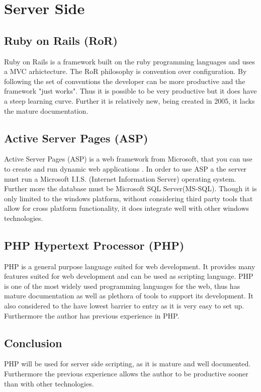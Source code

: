 \documentclass[a4paper,oneside,11pt]{report}
\begin{document}
\section{Server Side} 
\subsection{Ruby on Rails (RoR)}  
Ruby on Rails is a framework built on the ruby programming languages and uses a MVC arhictecture. The RoR philosophy is convention over configuration. By following the set of conventions the developer can be more productive and the framework "just works". Thus it is possible to be very productive but it does have a steep learning curve. Further it is relatively new, being created in 2005, it lacks the mature documentation.

\subsection{Active Server Pages (ASP)} 
 Active Server Pages (ASP) is a web framework from Microsoft, that you can use to create and run dynamic web applications \autocite{microsoftasp}. In order to use ASP a the server must run a Microsoft I.I.S. (Internet Information Server) operating system. Further more the database must be Microsoft SQL Server(MS-SQL). Though it is only limited to the windows platform, without considering third party tools that allow for cross platform functionality, it does integrate well with other windows technologies.
 
\subsection{PHP Hypertext Processor (PHP) } 
PHP is a general purpose language suited for web development. It provides many features suited for web development and can be used as scripting language. PHP is one of the most widely used programming languages for the web, thus has mature documentation as well as plethora of tools to support its development. It also considered to the have lowest barrier to entry as it is very easy to set up. Furthermore the author has previous experience in PHP.

\subsection{Conclusion}
PHP will be used for server side scripting, as it is mature and well documented. Furthermore the previous experience allows the author to be productive sooner than with other technologies.
\end{document}
